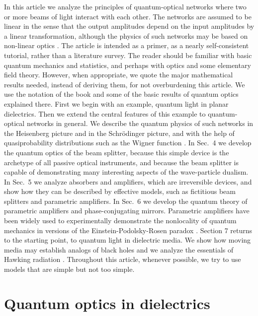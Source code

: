 \documentclass[12pt,amsmath,amssymb]{article}
\numberwithin{equation}{section}
\begin{document}
In this article we analyze the principles of quantum-optical
networks where two or more beams of light interact with each
other. The networks are assumed to be linear in the sense that
the output amplitudes depend on the input amplitudes by a linear
transformation, although the physics of such networks may be
based on non-linear optics \cite{Bloembergen,Perina,Shen}.
The article is
intended as a primer, as a nearly self-consistent tutorial, rather
than a literature survey. The reader should be familiar with
basic quantum mechanics and statistics, and perhaps with optics
and some elementary field theory. However, when appropriate, we
quote the major mathematical results needed, instead of deriving
them, for not overburdening this article. We use the notation of
the book \cite{Leonhardt} and some of the basic results of quantum
optics explained there. First we begin with an example, quantum
light in planar dielectrics. Then we extend the central features
of this example to quantum-optical networks in general. We
describe the quantum physics of such networks in the Heisenberg
picture and in the Schr\"odinger picture, and with the help of
quasiprobability distributions such as the Wigner function
\cite{Leonhardt}. In Sec.\ 4 we develop the quantum
optics of the beam splitter, because this simple device is the
archetype of all passive optical instruments, and because the
beam splitter is capable of demonstrating many interesting
aspects of the wave-particle dualism. In Sec.\ 5 we analyze
absorbers and amplifiers, which are irreversible devices, and show
how they can be described by effective models, such as fictitious beam
splitters and parametric amplifiers. In Sec.\ 6 we develop
the quantum theory of parametric amplifiers and
phase-conjugating mirrors. Parametric amplifiers have been widely
used to experimentally demonstrate the nonlocality of quantum
mechanics in versions of the Einstein-Podolsky-Rosen paradox
\cite{Bell,EPR}. Section 7 returns to the starting point, to
quantum light in dielectric media. We show how moving media may
establish analogs of black holes and we analyze the
essentials of Hawking radiation \cite{Hawking1}. Throughout
this article, whenever possible, we try to use models that are
simple but not too simple.

\section{Quantum optics in dielectrics}
\end{document}
